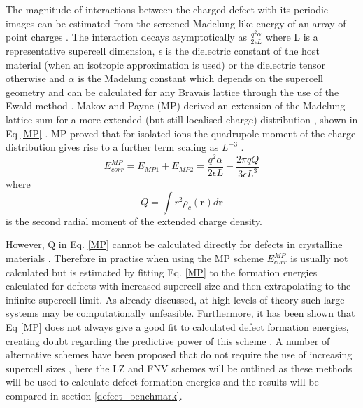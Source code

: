 \documentclass[11pt, twoside]{report}
\begin{document}
The magnitude of interactions between the charged defect with its periodic images can be estimated from the screened Madelung-like energy of an array of point charges \cite{LeslieGillan}.
The interaction decays asymptotically as $\frac{q^2\alpha}{2 \epsilon L}$ where L is a representative supercell dimension, $\epsilon$ is the dielectric constant of the host material (when an isotropic approximation is used) or the dielectric tensor otherwise \cite{kumagai_oba} and $\alpha$ is the Madelung constant which depends on the supercell geometry and can be calculated for any Bravais lattice through the use of the Ewald method \cite{Ewald, komsa}.
Makov and Payne (MP) derived an extension of the Madelung lattice sum for a more extended (but still localised charge) distribution \cite{MP}, shown in Eq \ref{MP} \cite{komsa}.
MP proved that for isolated ions the quadrupole moment of the charge distribution gives rise to a further term scaling as $L^{−3}$ \cite{MP, freysoldt_rev}.
\begin{equation}\label{MP}
E^{MP}_{corr} = E_{MP1} + E_{MP2} = \frac{q^2\alpha}{2 \epsilon L} - \frac{2 \pi q Q}{3 \epsilon L^3}
\end{equation}
where
\begin{equation}\label{MP_Q}
Q = \int r^2 \rho_c(\mathbf{r}) d\mathbf{r}
\end{equation}
is the second radial moment of the extended charge density.

However, Q in Eq. \ref{MP} cannot be calculated directly for defects in crystalline materials \cite{kumagai_oba, komsa, Lany_defects_2008}. Therefore in practise when using the MP scheme $E^{MP}_{corr}$ is usually not calculated but is estimated by fitting Eq. \ref{MP} to the formation energies calculated for defects with increased supercell size and then extrapolating to the infinite supercell limit. As already discussed, at high levels of theory such large systems may be computationally unfeasible. Furthermore, it has been shown that Eq \ref{MP} does not always give a good fit to calculated defect formation energies, creating doubt regarding the predictive power of this scheme \cite{FNV}. A number of alternative schemes have been proposed that do not require the use of increasing supercell sizes \cite{MP, LeslieGillan, PeterSchultz, Lany_defects, FNV, kumagai_oba}, here the LZ \cite{Lany_defects} and FNV \cite{FNV} schemes will be outlined as these methods will be used to calculate defect formation energies and the results will be compared in section \ref{defect_benchmark}.
\end{document}
